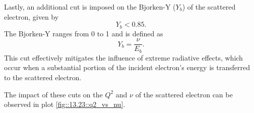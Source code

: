     Lastly, an additional cut is imposed on the Bjorken-Y ($Y_b$) of the scattered electron, given by
    \begin{equation*}
        Y_b < 0.85.
    \end{equation*}
    The Bjorken-Y ranges from 0 to 1 and is defined as
    \begin{equation*}
        Y_b = \frac{\nu}{E_b}.
    \end{equation*}
    This cut effectively mitigates the influence of extreme radiative effects, which occur when a substantial portion of the incident electron's energy is transferred to the scattered electron.


    The impact of these cuts on the $Q^2$ and $\nu$ of the scattered electron can be observed in plot \ref{fig::13.23::q2_vs_nu}.

